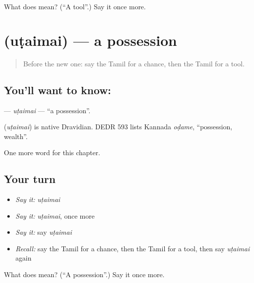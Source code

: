 \begin{tcolorbox}[breakable,colback=teal!4,colframe=teal!35!black,title={Before you move on}]
What does  mean? (\textquotedblleft{}A tool\textquotedblright{}.) Say it once more.
\end{tcolorbox}
\section[\texorpdfstring{\ta{உடைமை} (uṭaimai)}{உடைமை (uṭaimai)}]{ (uṭaimai) — a possession}

\label{lesson:TA-C117-utaimai}



\begin{quote}
Before the new one: say the Tamil for a chance, then the Tamil for a tool.
\end{quote}

\subsection*{You'll want to know: }
\textbf{} — \emph{uṭaimai} — \textquotedblleft{}a possession\textquotedblright{}.

\begin{cousinweb}
\textbf{} (\emph{uṭaimai}) is native Dravidian. DEDR 593 lists Kannada \emph{oḍame}, \textquotedblleft{}possession, wealth\textquotedblright{}.
\end{cousinweb}

\begin{grammarlens}[title={What you've built}]
One more word for this chapter.
\end{grammarlens}

\subsection*{Your turn}
\begin{itemize}
\raggedright
  \item \emph{Say it:} \emph{uṭaimai}
  \item \emph{Say it:} \emph{uṭaimai}, once more
  \item \emph{Say it:} say \emph{uṭaimai}
  \item \emph{Recall:} say the Tamil for a chance, then the Tamil for a tool, then say \emph{uṭaimai} again
\end{itemize}

\begin{tcolorbox}[breakable,colback=teal!4,colframe=teal!35!black,title={Before you move on}]
What does  mean? (\textquotedblleft{}A possession\textquotedblright{}.) Say it once more.
\end{tcolorbox}
